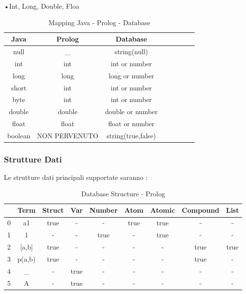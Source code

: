 •Int, Long, Double, Floa

\begin{table}[Ht]
\caption{Mapping Java -  Prolog - Database }
\begin{center}
\begin{tabular}{c c c c c c c c}
\hline
Java & Prolog & Database \\
\hline
null & {\_} & {string(null)} \\
int & int & int or number\\
long & long & long or number\\
short & int & int or number\\
byte & int & int or number \\
double & double & double or number \\
float & float & float or number \\
boolean & NON PERVENUTO & string{(true,false)} \\
\hline
\end{tabular}
\end{center}
\end{table}%

\subsubsection{Strutture Dati}

Le strutture dati principali supportate saranno :
\begin{table}[Ht]
\caption{Database Structure - Prolog}
\begin{center}
\begin{tabular}{l c c c c c c c c}
\hline
  & Term & Struct & Var & Number & Atom & Atomic & Compound & List \\
\hline
0 & a1 & true & - & - & true & true & - & - \\
1 & 1 & - & - & true & - & true & - & - \\
2 & {[a,b]} & true & - & - & - & - & true & true \\
3 & p(a,b) & true & - & - & - & - & true & - \\
4 & {\_} & - & true & - & - & - & - & - \\
5 & A & -& true & - & - & - & - & - \\
\hline
\end{tabular}
\end{center}
\end{table}%
